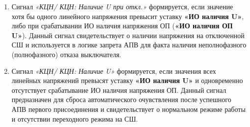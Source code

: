 \begin{enumerate}
\item
Сигнал \textit{«КЦН/ КЦН: Наличие U при откл.»} формируется, если значение хотя бы одного линейного напряжения превысит уставку \textbf{«ИО наличия U»}, либо при срабатывании ИО наличия напряжения ОП (\textbf{«ИО наличия ОП U»}). Данный сигнал свидетельствует о наличии напряжения на отключенной СШ и используется в логике запрета АПВ для факта наличия неполнофазного (полнофазного) отказа выключателя.

\item
Сигнал \textit{«КЦН/ КЦН: Наличие U»} формируется, если значения всех линейных напряжений превысят уставку \textbf{«ИО наличия U»} и одновременно отсутствует срабатывание ИО наличия напряжения ОП.
Данный сигнал предназначен для сброса автоматического очувствления после успешного АПВ первого присоединения и свидетельствует о нормальном режиме работы и отсутствии переходного режима на СШ.

\end{enumerate}
